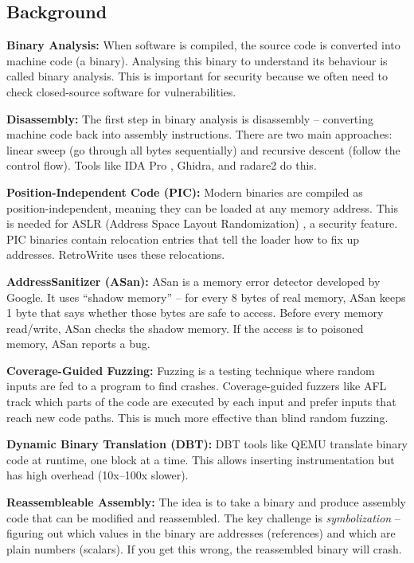 \documentclass[10pt,a4paper]{article}
\begin{document}
\subsection{Background}

\textbf{Binary Analysis:} When software is compiled, the source code is converted into machine code (a binary). Analysing this binary to understand its behaviour is called binary analysis. This is important for security because we often need to check closed-source software for vulnerabilities.

\textbf{Disassembly:} The first step in binary analysis is disassembly -- converting machine code back into assembly instructions. There are two main approaches: linear sweep (go through all bytes sequentially) and recursive descent (follow the control flow). Tools like IDA Pro \cite{idapro}, Ghidra, and radare2 \cite{radare2} do this.

\textbf{Position-Independent Code (PIC):} Modern binaries are compiled as position-independent, meaning they can be loaded at any memory address. This is needed for ASLR (Address Space Layout Randomization) \cite{aslr}, a security feature. PIC binaries contain relocation entries that tell the loader how to fix up addresses. RetroWrite uses these relocations.

\textbf{AddressSanitizer (ASan):} ASan \cite{asan} is a memory error detector developed by Google. It uses ``shadow memory'' -- for every 8 bytes of real memory, ASan keeps 1 byte that says whether those bytes are safe to access. Before every memory read/write, ASan checks the shadow memory. If the access is to poisoned memory, ASan reports a bug.

\textbf{Coverage-Guided Fuzzing:} Fuzzing is a testing technique where random inputs are fed to a program to find crashes. Coverage-guided fuzzers like AFL \cite{afl} track which parts of the code are executed by each input and prefer inputs that reach new code paths. This is much more effective than blind random fuzzing.

\textbf{Dynamic Binary Translation (DBT):} DBT tools like QEMU translate binary code at runtime, one block at a time. This allows inserting instrumentation but has high overhead (10x--100x slower).

\textbf{Reassembleable Assembly:} The idea is to take a binary and produce assembly code that can be modified and reassembled. The key challenge is \textit{symbolization} -- figuring out which values in the binary are addresses (references) and which are plain numbers (scalars). If you get this wrong, the reassembled binary will crash.
\end{document}
